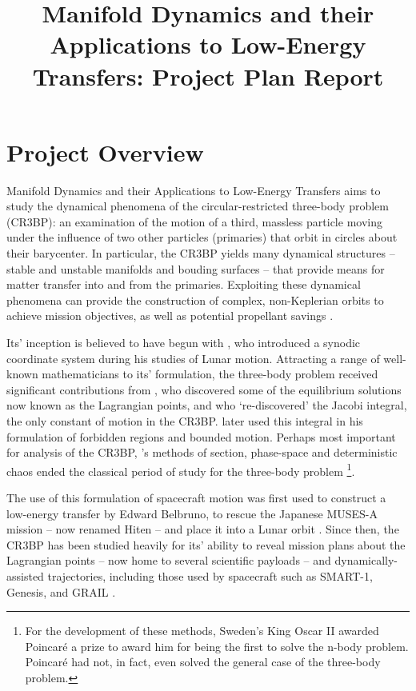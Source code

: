 \documentclass[paper=letter, fontsize=11pt]{article}
\title{\vspace{-15mm}\raggedright\fontsize{18pt}{10pt}\selectfont\textbf{Manifold Dynamics and their Applications to Low-Energy Transfers: Project Plan Report}} %
\date{}
\begin{document}
\maketitle %

\section*{Project Overview}
Manifold Dynamics and their Applications to Low-Energy Transfers aims to study the dynamical phenomena of the circular-restricted three-body problem (CR3BP): an examination of the motion of a third, massless particle moving under the influence of two other particles (primaries) that orbit in circles about their barycenter. In particular, the CR3BP yields many dynamical structures -- stable and unstable manifolds and bouding surfaces -- that provide means for matter transfer into and from the primaries. Exploiting these dynamical phenomena can provide the construction of complex, non-Keplerian orbits to achieve mission objectives, as well as potential propellant savings \citep{Parker2014}. 

Its' inception is believed to have begun with \citep{Euler1736}, who introduced a synodic coordinate system during his studies of Lunar motion. Attracting a range of well-known mathematicians to its' formulation, the three-body problem received significant contributions from \citep{Lagrange}, who discovered some of the equilibrium solutions now known as the Lagrangian points, and \citep{Jacobi1829} who `re-discovered' the Jacobi integral, the only constant of motion in the CR3BP. \citep{Hill1906} later used this integral in his formulation of forbidden regions and bounded motion. Perhaps most important for analysis of the CR3BP, \citep{Poincare1899}'s methods of section, phase-space and deterministic chaos ended the classical period of study for the three-body problem \footnote{For the development of these methods, Sweden's King Oscar II awarded Poincar\'e a prize to award him for being the first to solve the n-body problem. Poincar\'e had not, in fact, even solved the general case of the three-body problem.}\citep{theoryoforbits}.

The use of this formulation of spacecraft motion was first used to construct a low-energy transfer by Edward Belbruno, to rescue the Japanese MUSES-A mission -- now renamed Hiten -- and place it into a Lunar orbit \citep{Belbruno2004}. Since then, the CR3BP has been studied heavily for its' ability to reveal mission plans about the Lagrangian points -- now home to several scientific payloads -- and dynamically-assisted trajectories, including those used by spacecraft such as SMART-1, Genesis, and GRAIL \citep{Topputo2005}. 
\end{document}
